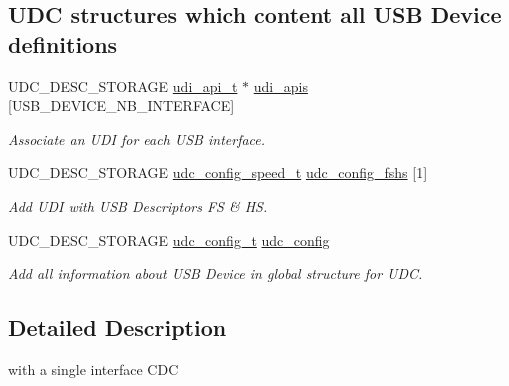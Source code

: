 \subsection*{\-U\-D\-C structures which content all \-U\-S\-B \-Device definitions}
\begin{DoxyCompactItemize}
\item 
\-U\-D\-C\-\_\-\-D\-E\-S\-C\-\_\-\-S\-T\-O\-R\-A\-G\-E \hyperlink{structudi__api__t}{udi\-\_\-api\-\_\-t} $\ast$ \hyperlink{group__udi__cdc__group__desc_ga5356b021bc068e4b564577e38b44ba0e}{udi\-\_\-apis} \mbox{[}\-U\-S\-B\-\_\-\-D\-E\-V\-I\-C\-E\-\_\-\-N\-B\-\_\-\-I\-N\-T\-E\-R\-F\-A\-C\-E\mbox{]}
\begin{DoxyCompactList}\small\item\em \-Associate an \-U\-D\-I for each \-U\-S\-B interface. \end{DoxyCompactList}\item 
\-U\-D\-C\-\_\-\-D\-E\-S\-C\-\_\-\-S\-T\-O\-R\-A\-G\-E \hyperlink{structudc__config__speed__t}{udc\-\_\-config\-\_\-speed\-\_\-t} \hyperlink{group__udi__cdc__group__desc_ga75bec31a56e1233cbb933ce3391429b2}{udc\-\_\-config\-\_\-fshs} \mbox{[}1\mbox{]}
\begin{DoxyCompactList}\small\item\em \-Add \-U\-D\-I with \-U\-S\-B \-Descriptors \-F\-S \& \-H\-S. \end{DoxyCompactList}\item 
\-U\-D\-C\-\_\-\-D\-E\-S\-C\-\_\-\-S\-T\-O\-R\-A\-G\-E \hyperlink{structudc__config__t}{udc\-\_\-config\-\_\-t} \hyperlink{group__udi__cdc__group__desc_ga40ae5a61fbfa7e289136b2f9fd190217}{udc\-\_\-config}
\begin{DoxyCompactList}\small\item\em \-Add all information about \-U\-S\-B \-Device in global structure for \-U\-D\-C. \end{DoxyCompactList}\end{DoxyCompactItemize}


\subsection{\-Detailed \-Description}
with a single interface \-C\-D\-C 

